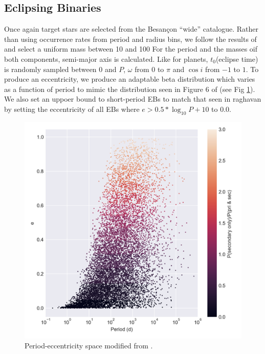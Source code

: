 \documentclass{article}
\begin{document}
\subsection{Eclipsing Binaries}
Once again target stars are selected from the Besan\c{c}on “wide” catalogue. Rather than using occurrence rates from period and radius bins, we follow the results of \citet{raghavan2010survey} and select a uniform mass between 10 and 100%
For the period and the masses oif both components, semi-major axis is calculated. Like for planets, $t_0$(eclipse time) is randomly sampled between 0 and $P$, $\omega$ from $0$ to $\pi$ and $\cos{i}$ from $-1$ to $1$.
To produce an eccentricity, we produce an adaptable beta distribution which varies as a function of period to mimic the distribution seen in Figure 6 of \citet{raghavan2010survey} (see Fig \ref{fig:EBecc}). 
We also set an uppoer bound to short-period EBs to match that seen in raghavan by setting the eccentricity of all EBs where $e>0.5*\log_10{P+10}$ to $0.0$.

\begin{figure}
    \centering
    \includegraphics[width=\textwidth]{raghavan_Peccs.png}
    \caption{Period-eccentricity space modified from \citet{raghavan2010survey}.}
    \label{fig:EBecc}
\end{figure}
\end{document}
